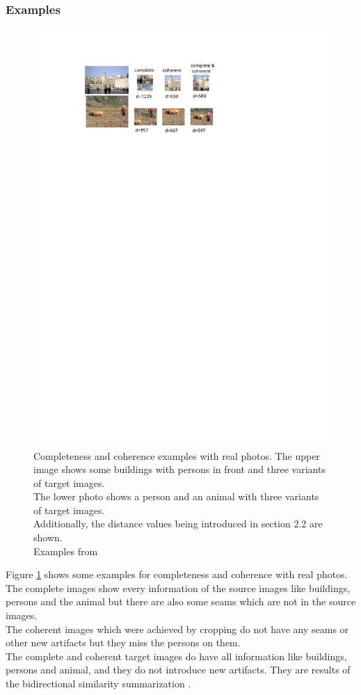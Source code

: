 \subsubsection*{Examples}
\begin{figure}[h]
\centering
\includegraphics[scale=0.9]{img/compcohexample}
\caption[Compcohexample]{Completeness and coherence examples with real photos. The upper image shows some buildings with persons in front and three variants of target images.\\ The lower photo shows a person and an animal with three variants of target images.\\ Additionally, the distance values being introduced in section 2.2 are shown.\\ Examples from \cite{bisi} }
\label{fig:Compcohexample}
\end{figure}

Figure \ref{fig:Compcohexample} shows some examples for completeness and coherence with real photos. The complete images show every information of the source images like buildings, persons and the animal but there are also some seams which are not in the source images.\\
The coherent images which were achieved by cropping \cite{bisi} do not have any seams or other new artifacts but they miss the persons on them.\\
The complete and coherent target images do have all information like buildings, persons and animal, and they do not introduce new artifacts. They are results of the bidirectional similarity summarization \cite{bisi}.


